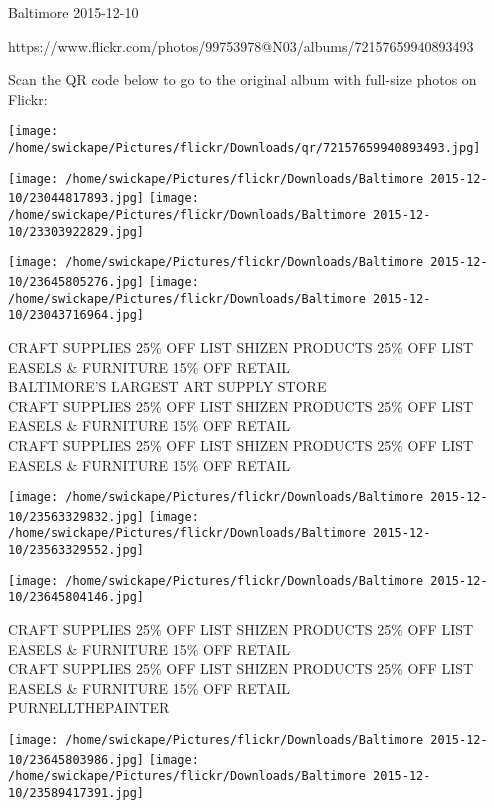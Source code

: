 \documentclass[10pt,letterpaper]{article}
\begin{document}
Baltimore 2015-12-10

https://www.flickr.com/photos/99753978@N03/albums/72157659940893493

Scan the QR code below to go to the original album with full-size photos on Flickr:

\texttt{[image: /home/swickape/Pictures/flickr/Downloads/qr/72157659940893493.jpg]}
\pagebreak

\texttt{[image: /home/swickape/Pictures/flickr/Downloads/Baltimore 2015-12-10/23044817893.jpg]}
\texttt{[image: /home/swickape/Pictures/flickr/Downloads/Baltimore 2015-12-10/23303922829.jpg]}

\texttt{[image: /home/swickape/Pictures/flickr/Downloads/Baltimore 2015-12-10/23645805276.jpg]}
\texttt{[image: /home/swickape/Pictures/flickr/Downloads/Baltimore 2015-12-10/23043716964.jpg]}

CRAFT SUPPLIES 25\% OFF LIST SHIZEN PRODUCTS 25\% OFF LIST EASELS \& FURNITURE 15\% OFF RETAIL\\
BALTIMORE'S LARGEST ART SUPPLY STORE\\
CRAFT SUPPLIES 25\% OFF LIST SHIZEN PRODUCTS 25\% OFF LIST EASELS \& FURNITURE 15\% OFF RETAIL\\
CRAFT SUPPLIES 25\% OFF LIST SHIZEN PRODUCTS 25\% OFF LIST EASELS \& FURNITURE 15\% OFF RETAIL\\
\pagebreak

\texttt{[image: /home/swickape/Pictures/flickr/Downloads/Baltimore 2015-12-10/23563329832.jpg]}
\texttt{[image: /home/swickape/Pictures/flickr/Downloads/Baltimore 2015-12-10/23563329552.jpg]}

\vspace{0.25in}
\texttt{[image: /home/swickape/Pictures/flickr/Downloads/Baltimore 2015-12-10/23645804146.jpg]}

CRAFT SUPPLIES 25\% OFF LIST SHIZEN PRODUCTS 25\% OFF LIST EASELS \& FURNITURE 15\% OFF RETAIL\\
CRAFT SUPPLIES 25\% OFF LIST SHIZEN PRODUCTS 25\% OFF LIST EASELS \& FURNITURE 15\% OFF RETAIL\\
PURNELLTHEPAINTER\\
\pagebreak

\texttt{[image: /home/swickape/Pictures/flickr/Downloads/Baltimore 2015-12-10/23645803986.jpg]}
\texttt{[image: /home/swickape/Pictures/flickr/Downloads/Baltimore 2015-12-10/23589417391.jpg]}
\end{document}

